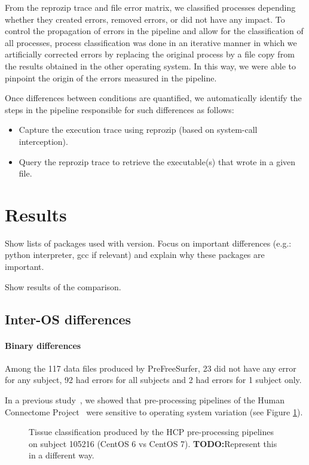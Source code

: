 \documentclass{article}
\newcommand{\todo}[1]{\color{red}\textbf{TODO:}#1\color{black}}
\begin{document}
From the reprozip trace and file error matrix, we classified
 processes depending whether they created errors, removed errors, or
 did not have any impact. To control the propagation of errors in the
 pipeline and allow for the classification of all processes, process
 classification was done in an iterative manner in which we
 artificially corrected errors by replacing the original process by a
 file copy from the results obtained in the other operating system. In
 this way, we were able to pinpoint the origin of the errors measured
 in the pipeline.

 Once differences between conditions are quantified, we automatically identify the steps in the pipeline responsible for such differences as follows:
\begin{itemize}
\item Capture the execution trace using reprozip (based on system-call interception).
\item Query the reprozip trace to retrieve the executable(s) that wrote in a given file.
\end{itemize}

\section{Results}

Show lists of packages used with version. Focus on important
differences (e.g.: python interpreter, gcc if relevant) and explain
why these packages are important.

Show results of the comparison.

\subsection{Inter-OS differences}


\paragraph{Binary differences}


Among the 117 data files produced by PreFreeSurfer, 23 did not have any error for any subject, 92 had errors 
for all subjects and 2 had errors for 1 subject only. 

In a previous study~\cite{Scaria2017}, we showed that
pre-processing pipelines of the Human Connectome
Project~\cite{Glasser2013} were sensitive to operating system
variation (see Figure \ref{fig:1}).
\begin{figure}
  \caption{Tissue classification produced by the HCP pre-processing
    pipelines on subject 105216 (CentOS 6 vs CentOS 7). \todo{Represent this in a different way.}}
  \label{fig:1}
\end{figure}
\end{document}
